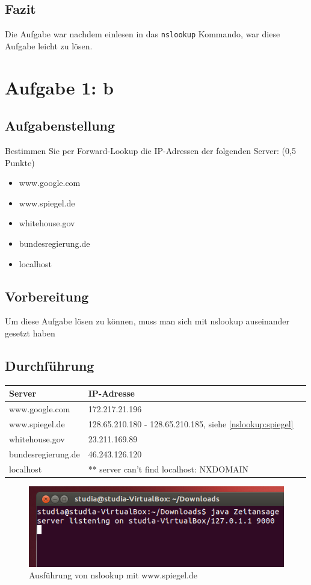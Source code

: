 \subsection{Fazit}
Die Aufgabe war nachdem einlesen in das \texttt{nslookup} Kommando, war diese Aufgabe leicht zu lösen.

\newpage
\section{Aufgabe 1: b}

\subsection{Aufgabenstellung}
Bestimmen Sie per Forward-Lookup die IP-Adressen der folgenden Server: (0,5 Punkte)

\begin{itemize} 
\item www.google.com
\item www.spiegel.de
\item whitehouse.gov
\item bundesregierung.de
\item localhost
\end{itemize}

\subsection{Vorbereitung}
Um diese Aufgabe lösen zu können, muss man sich mit nslookup auseinander gesetzt haben

\subsection{Durchführung}
\begin{table}[H]
	\tablestyle
	\begin{tabular}{lll}
		\toprule
			Server & IP-Adresse \tabularnewline
				
		\midrule
			www.google.com & 172.217.21.196 \tabularnewline
			www.spiegel.de & 128.65.210.180 - 128.65.210.185, siehe  \autoref{nslookup:spiegel} \tabularnewline
			whitehouse.gov & 23.211.169.89 \tabularnewline
			bundesregierung.de & 46.243.126.120 \tabularnewline
			localhost & ** server can't find localhost: NXDOMAIN \tabularnewline
			
	\end{tabular}
\end{table}

\begin{figure}[H]
	\centering
	\includegraphics[width=0.4 \linewidth]{images/13}
	\caption{Ausführung von nslookup mit www.spiegel.de} \label{nslookup:spiegel}
\end{figure}

